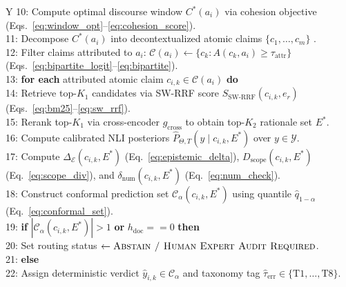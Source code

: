 \documentclass[journal]{IEEEtran}
\begin{document}
\begin{table}[t]
\begin{tabularx}{\columnwidth}{Y}
10: \hspace{0.5em} Compute optimal discourse window $C^*(a_i)$ via cohesion objective (Eqs.~\ref{eq:window_opt}--\ref{eq:cohesion_score}). \\
11: \hspace{0.5em} Decompose $C^*(a_i)$ into decontextualized atomic claims $\{c_1, \dots, c_m\}$ \cite{kamoi2023wice,min2023factscore}. \\
12: \hspace{0.5em} Filter claims attributed to $a_i$: $\mathcal{C}(a_i) \leftarrow \{c_k : A(c_k, a_i) \geq \tau_{\text{attr}}\}$ (Eqs.~\ref{eq:bipartite_logit}--\ref{eq:bipartite}). \\
13: \hspace{0.5em} \textbf{for each} attributed atomic claim $c_{i,k} \in \mathcal{C}(a_i)$ \textbf{do} \\
14: \hspace{1.3em} Retrieve top-$K_1$ candidates via SW-RRF score $S_{\text{SW-RRF}}(c_{i,k}, e_r)$ (Eqs.~\ref{eq:bm25}--\ref{eq:sw_rrf}). \\
15: \hspace{1.3em} Rerank top-$K_1$ via cross-encoder $g_{\text{cross}}$ to obtain top-$K_2$ rationale set $E^*$. \\
16: \hspace{1.3em} Compute calibrated NLI posteriors $\hat{P}_{\Theta, T}(y \mid c_{i,k}, E^*)$ over $y \in \mathcal{Y}$. \\
17: \hspace{1.3em} Compute $\Delta_{\mathcal{E}}(c_{i,k}, E^*)$ (Eq.~\ref{eq:epistemic_delta}), $D_{\text{scope}}(c_{i,k}, E^*)$ (Eq.~\ref{eq:scope_div}), and $\delta_{\text{num}}(c_{i,k}, E^*)$ (Eq.~\ref{eq:num_check}). \\
18: \hspace{1.3em} Construct conformal prediction set $\mathcal{C}_{\alpha}(c_{i,k}, E^*)$ using quantile $\hat{q}_{1-\alpha}$ (Eq.~\ref{eq:conformal_set}). \\
19: \hspace{1.3em} \textbf{if} $|\mathcal{C}_{\alpha}(c_{i,k}, E^*)| > 1$ \textbf{or} $h_{\text{doc}} == 0$ \textbf{then} \\
20: \hspace{2.1em} Set routing status $\leftarrow \textsc{Abstain / Human Expert Audit Required}$. \\
21: \hspace{1.3em} \textbf{else} \\
22: \hspace{2.1em} Assign deterministic verdict $\hat{y}_{i,k} \in \mathcal{C}_{\alpha}$ and taxonomy tag $\hat{\tau}_{\text{err}} \in \{\text{T1}, \dots, \text{T8}\}$. \\

\end{tabularx}
\end{table}
\end{document}
